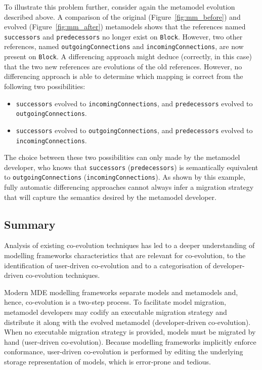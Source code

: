 To illustrate this problem further, consider again the metamodel evolution described above. A comparison of the original (Figure~\ref{fig:mm_before}) and evolved (Figure~\ref{fig:mm_after}) metamodels shows that the references named \texttt{successors} and \texttt{predecessors} no longer exist on \texttt{Block}. However, two other references, named \texttt{out\-go\-ingCon\-nect\-ions} and \texttt{incomingConnections}, are now present on \texttt{Block}. A differencing approach might deduce (correctly, in this case) that the two new references are evolutions of the old references. However, no differencing approach is able to determine which mapping is correct from the following two possibilities:

\begin{itemize}
	\item \texttt{successors} evolved to \texttt{incomingConnections}, and \texttt{predecessors} evolved to \texttt{outgoingConnections}.
	\item \texttt{successors} evolved to \texttt{outgoingConnections}, and \texttt{predecessors} evolved to \texttt{incomingConnections}.
\end{itemize}

The choice between these two possibilities can only made by the metamodel developer, who knows that \texttt{successors} (\texttt{predecessors}) is semantically equivalent to \texttt{outgoingConnections} (\texttt{incomingConnections}). As shown by this example, fully automatic differencing approaches cannot always infer a migration strategy that will capture the semantics desired by the metamodel developer.


\subsection{Summary}
Analysis of existing co-evolution techniques has led to a deeper understanding of modelling frameworks characteristics that are relevant for co-evolution, to the identification of user-driven co-evolution and to a categorisation of developer-driven co-evolution techniques.

Modern MDE modelling frameworks separate models and metamodels and, hence, co-evolution is a two-step process. To facilitate model migration, metamodel developers may codify an executable migration strategy and distribute it along with the evolved metamodel (developer-driven co-evolution). When no executable migration strategy is provided, models must be migrated by hand (user-driven co-evolution). Because modelling frameworks implicitly enforce conformance, user-driven co-evolution is performed by editing the underlying storage representation of models, which is error-prone and tedious.

